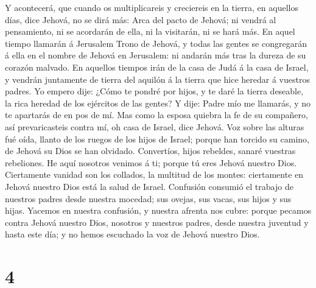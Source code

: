  Y acontecerá, que cuando os multiplicareis y creciereis en
la tierra, en aquellos días, dice Jehová, no se dirá más: Arca del pacto
de Jehová; ni vendrá al pensamiento, ni se acordarán de ella, ni la
visitarán, ni se hará más.  En aquel tiempo llamarán á
Jerusalem Trono de Jehová, y todas las gentes se congregarán á ella en
el nombre de Jehová en Jerusalem: ni andarán más tras la dureza de su
corazón malvado.  En aquellos tiempos irán de la casa de
Judá á la casa de Israel, y vendrán juntamente de tierra del aquilón á
la tierra que hice heredar á vuestros padres.  Yo empero
dije: ¿Cómo te pondré por hijos, y te daré la tierra deseable, la rica
heredad de los ejércitos de las gentes? Y dije: Padre mío me llamarás, y
no te apartarás de en pos de mí.  Mas como la esposa
quiebra la fe de su compañero, así prevaricasteis contra mí, oh casa de
Israel, dice Jehová.  Voz sobre las alturas fué oída,
llanto de los ruegos de los hijos de Israel; porque han torcido su
camino, de Jehová su Dios se han olvidado.  Convertíos,
hijos rebeldes, sanaré vuestras rebeliones. He aquí nosotros venimos á
ti; porque tú eres Jehová nuestro Dios.  Ciertamente
vanidad son los collados, la multitud de los montes: ciertamente en
Jehová nuestro Dios está la salud de Israel.  Confusión
consumió el trabajo de nuestros padres desde nuestra mocedad; sus
ovejas, sus vacas, sus hijos y sus hijas.  Yacemos en
nuestra confusión, y nuestra afrenta nos cubre: porque pecamos contra
Jehová nuestro Dios, nosotros y nuestros padres, desde nuestra juventud
y hasta este día; y no hemos escuchado la voz de Jehová nuestro Dios.

\hypertarget{section-3}{%
\section{4}\label{section-3}}

